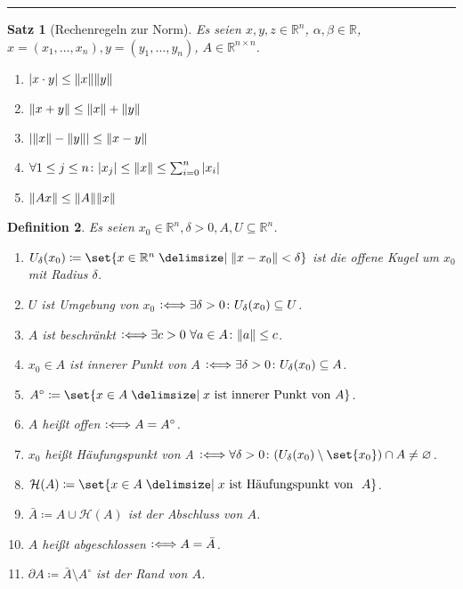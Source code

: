 \documentclass[a4paper]{article}
\newcounter{Sec}
\theoremstyle{marginbreak}
\newtheorem{definition}{Definition}[Sec]
\newtheorem{satz}[definition]{Satz}
\newcommand{\sep}{%
	\rule{\textwidth}{0.3pt}%
	\stepcounter{Sec}%
	}
\newcommand{\defiff}{\mathrel{\vcentcolon\Longleftrightarrow}}
\begin{document}
	\sep
	\begin{satz}[Rechenregeln zur Norm]
		Es seien $x, y, z\in\mathbb{R}^n$, $\alpha, \beta\in\mathbb{R}$, $x=(x_1,\ldots,x_n), y=(y_1,\ldots,y_n)$, $A\in\mathbb{R}^{n\times n}$.
		\begin{enumerate}[label=(\alph*)]
			\item $\abs{x\cdot y} \leq \norm{x}\norm{y}$
			\item $\norm{x + y} \leq \norm{x} + \norm{y}$
			\item $\abs{\norm{x} - \norm{y}} \leq \norm{x - y}$
			\item $\forall 1\leq j\leq n\colon \abs{x_j}\leq\norm{x}\leq\sum_{i=0}^n\abs{x_i}$
			\item $\norm{Ax}\leq\norm{A}\norm{x}$
		\end{enumerate}
	\end{satz}
	\begin{definition}
		Es seien $x_0\in\mathbb{R}^n, \delta>0, A, U\subseteq\mathbb{R}^n$.
		\begin{enumerate}[label=(\alph*)]
			\item $U_\delta(x_0)\coloneqq\set{x\in\mathbb{R}^n\given\norm{x-x_0}<\delta}$ ist die offene Kugel
				um $x_0$ mit Radius $\delta$.
			\item $U$ ist Umgebung von $x_0$ $\defiff\exists\delta>0\colon U_\delta(x_0)\subseteq U$.
			\item $A$ ist beschränkt $\defiff\exists c>0\ \forall a\in A\colon \norm{a}\leq c$.
			\item $x_0\in A$ ist innerer Punkt von $A$ $\defiff\exists\delta>0\colon U_\delta(x_0)\subseteq A$.
			\item $A^\circ\coloneqq\set{x\in A\given x\ \text{ist innerer Punkt von}\ A}$.
			\item $A$ heißt offen $\defiff A=A^\circ$.
			\item $x_0$ heißt Häufungspunkt von A $\defiff\forall\delta>0\colon(U_\delta(x_0)\setminus\set{x_0})\cap A\neq\varnothing$.
			\item $\mathcal{H}(A)\coloneqq\set{x\in A\given x\ \text{ist Häufungspunkt von }\ A}$.
			\item $\bar{A}\coloneqq A\cup\mathcal{H}(A)$ ist der Abschluss von $A$.
			\item $A$ heißt abgeschlossen $\defiff A = \bar{A}$.
			\item $\partial A\coloneqq \bar{A}\setminus A^\circ$ ist der Rand von $A$.
		\end{enumerate}
	\end{definition}
\end{document}

